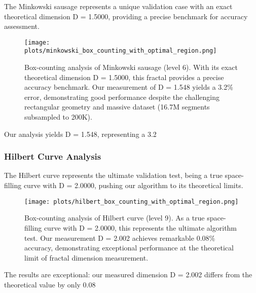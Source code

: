 \documentclass[preprint,12pt]{elsarticle}
\begin{document}
The Minkowski sausage represents a unique validation case with an exact theoretical dimension D = 1.5000, providing a precise benchmark for accuracy assessment.

\begin{figure}[ht]
\centering
\texttt{[image: plots/minkowski\_box\_counting\_with\_optimal\_region.png]}
\caption{Box-counting analysis of Minkowski sausage (level 6). With its exact theoretical dimension D = 1.5000, this fractal provides a precise accuracy benchmark. Our measurement of D = 1.548 yields a 3.2\% error, demonstrating good performance despite the challenging rectangular geometry and massive dataset (16.7M segments subsampled to 200K).}
\label{fig:minkowski_boxcounting}
\end{figure}

Our analysis yields D = 1.548, representing a 3.2%

\subsubsection{Hilbert Curve Analysis}

The Hilbert curve represents the ultimate validation test, being a true space-filling curve with D = 2.0000, pushing our algorithm to its theoretical limits.

\begin{figure}[ht]
\centering
\texttt{[image: plots/hilbert\_box\_counting\_with\_optimal\_region.png]}
\caption{Box-counting analysis of Hilbert curve (level 9). As a true space-filling curve with D = 2.0000, this represents the ultimate algorithm test. Our measurement D = 2.002 achieves remarkable 0.08\% accuracy, demonstrating exceptional performance at the theoretical limit of fractal dimension measurement.}
\label{fig:hilbert_boxcounting}
\end{figure}

The results are exceptional: our measured dimension D = 2.002 differs from the theoretical value by only 0.08%
\end{document}
